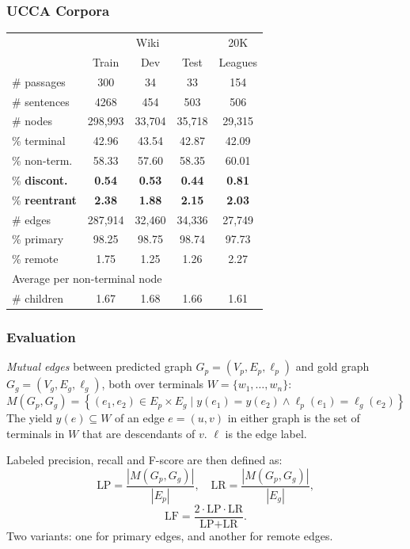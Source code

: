 \documentclass[t]{beamer}
\begin{document}
\begin{frame}
\frametitle{UCCA Corpora}
\centering
	\begin{tabular}{l|ccc|c}
		& \multicolumn{3}{c|}{Wiki} & 20K \\
		& \small Train & \small Dev & \small Test & Leagues \\
		\hline
		\# passages & 300 & 34 & 33 & 154 \\
		\# sentences & 4268 & 454 & 503 & 506 \\
		\hline
		\# nodes & 298,993 & 33,704 & 35,718 & 29,315 \\
		\% terminal & 42.96 & 43.54 & 42.87 & 42.09 \\
		\% non-term. & 58.33 & 57.60 & 58.35 & 60.01 \\
		\% \textbf{discont.} & \textbf{0.54} & \textbf{0.53} & \textbf{0.44} & \textbf{0.81} \\
		\% \textbf{reentrant} & \textbf{2.38} & \textbf{1.88} & \textbf{2.15} & \textbf{2.03} \\
		\hline
		\# edges & 287,914 & 32,460 & 34,336 & 27,749 \\
		\% primary & 98.25 & 98.75 & 98.74 & 97.73 \\
		\% remote & 1.75 & 1.25 & 1.26 & 2.27 \\
		\hline
		\multicolumn{3}{l}{\footnotesize Average per non-terminal node} \\
		\# children & 1.67 & 1.68 & 1.66 & 1.61 
	\end{tabular}
\end{frame}

\begin{frame}
\frametitle{Evaluation}
\textit{Mutual edges} between predicted graph $G_p=(V_p,E_p,\ell_p)$
and gold graph $G_g=(V_g,E_g,\ell_g)$,
both over terminals $W = \{w_1,\ldots,w_n\}$:
\[
M(G_p,G_g) =
    \left\{(e_1,e_2) \in E_p \times E_g \;|\;
    y(e_1) = y(e_2) \wedge \ell_p(e_1)=\ell_g(e_2)\right\}
\]
The yield $y(e) \subseteq W$ of an edge $e=(u,v)$ in either graph
is the set of terminals in $W$ that are descendants of $v$. \hfill
$\ell$ is the edge label.

\vfill
\pause
Labeled precision, recall and F-score are then defined as:
\[
\text{LP} = \frac{|M(G_p,G_g)|}{|E_p|},\quad
\text{LR} = \frac{|M(G_p,G_g)|}{|E_g|},
\]
\[
\text{LF} = \frac{2 \cdot \text{LP} \cdot \text{LR}}{\text{LP} + \text{LR}}.
\]
Two variants:
one for primary edges, and another for remote edges.
\end{frame}
\end{document}
